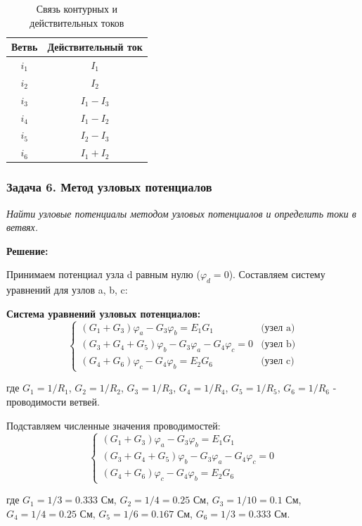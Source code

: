 \begin{table}[H]
\centering
\begin{tabular}{|c|c|}
\hline
\textbf{Ветвь} & \textbf{Действительный ток} \\
\hline
$i_1$ & $I_1$ \\
\hline
$i_2$ & $I_2$ \\
\hline
$i_3$ & $I_1 - I_3$ \\
\hline
$i_4$ & $I_1 - I_2$ \\
\hline
$i_5$ & $I_2 - I_3$ \\
\hline
$i_6$ & $I_1 + I_2$ \\
\hline
\end{tabular}
\caption{Связь контурных и действительных токов}
\label{tab:loop_to_branch_currents}
\end{table}

\subsubsection{Задача 6. Метод узловых потенциалов}
\textit{Найти узловые потенциалы методом узловых потенциалов и определить токи в ветвях.}

\textbf{Решение:}

Принимаем потенциал узла d равным нулю ($\varphi_d = 0$). Составляем систему уравнений для узлов a, b, c:

\textbf{Система уравнений узловых потенциалов:}
$$\begin{cases}
(G_1 + G_3)\varphi_a - G_3\varphi_b = E_1 G_1 & \text{(узел a)} \\
(G_3 + G_4 + G_5)\varphi_b - G_3\varphi_a - G_4\varphi_c = 0 & \text{(узел b)} \\
(G_4 + G_6)\varphi_c - G_4\varphi_b = E_2 G_6 & \text{(узел c)}
\end{cases}$$

где $G_1 = 1/R_1$, $G_2 = 1/R_2$, $G_3 = 1/R_3$, $G_4 = 1/R_4$, $G_5 = 1/R_5$, $G_6 = 1/R_6$ - проводимости ветвей.

Подставляем численные значения проводимостей:
$$\begin{cases}
(G_1 + G_3)\varphi_a - G_3\varphi_b = E_1 G_1 \\
(G_3 + G_4 + G_5)\varphi_b - G_3\varphi_a - G_4\varphi_c = 0 \\
(G_4 + G_6)\varphi_c - G_4\varphi_b = E_2 G_6
\end{cases}$$

где $G_1 = 1/3 = 0.333$ См, $G_2 = 1/4 = 0.25$ См, $G_3 = 1/10 = 0.1$ См, $G_4 = 1/4 = 0.25$ См, $G_5 = 1/6 = 0.167$ См, $G_6 = 1/3 = 0.333$ См.

